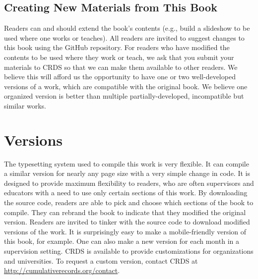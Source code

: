 \subsection{Creating New Materials from This Book}
Readers can and should extend the book's contents (e.g., build a slideshow to be used where one works or teaches). All readers are invited to suggest changes to this book using the GitHub repository. For readers who have modified the contents to be used where they work or teach, we ask that you submit your materials to CRDS so that we can make them available to other readers. We believe this will afford us the opportunity to have one or two well-developed versions of a work, which are compatible with the original book. We believe one organized version is better than multiple partially-developed, incompatible but similar works. 



\section{Versions}
The typesetting system used to compile this work is very flexible. It can compile a similar version for nearly any page size with a very simple change in code. It is designed to provide maximum flexibility to readers, who are often supervisors and educators with a need to use only certain sections of this work. By downloading the source code, readers are able to pick and choose which sections of the book to compile. They can rebrand the book to indicate that they modified the original version. Readers are invited to tinker with the source code to download modified versions of the work. It is surprisingly easy to make a mobile-friendly version of this book, for example. One can also make a new version for each month in a supervision setting. CRDS is available to provide customizations for organizations and universities. To request a custom version, contact CRDS at \url{http://cumulativerecords.org/contact}.
